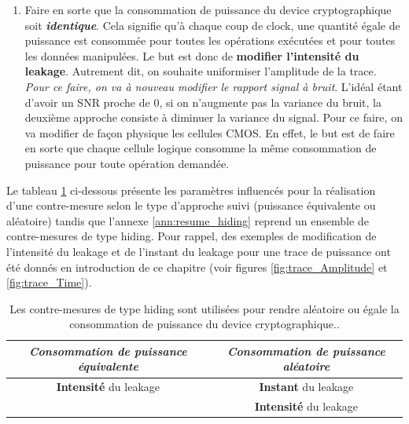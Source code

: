 \documentclass[oneside]{book}
\begin{document}
\begin{enumerate}
\item Faire en sorte que la consommation de puissance du device cryptographique soit \textbf{\textit{identique}}. Cela signifie qu'à chaque coup de clock, une quantité égale de puissance est consommée pour toutes les opérations exécutées et pour toutes les données manipulées. Le but est donc de \textbf{modifier l'intensité du leakage}. Autrement dit, on souhaite uniformiser l'amplitude de la trace. 
\textit{Pour ce faire, on va à nouveau modifier le rapport signal à bruit}. L'idéal étant d'avoir un SNR proche de 0, si on n'augmente pas la variance du bruit, la deuxième approche consiste à diminuer la variance du signal. Pour ce faire, on va modifier de façon physique les cellules CMOS. En effet, le but est de faire en sorte que chaque cellule logique consomme la même consommation de puissance pour toute opération demandée. \\
\end{enumerate}

\hspace{-0.5cm}Le tableau \ref{tab:hiding} ci-dessous présente les paramètres influencés pour la réalisation d'une contre-mesure selon le type d'approche suivi (puissance équivalente ou aléatoire) tandis que l'annexe \ref{ann:resume_hiding} reprend un ensemble de contre-mesures de type hiding. Pour rappel, des exemples de modification de l'intensité du leakage et de l'instant du leakage pour une trace de puissance ont été donnés en introduction de ce chapitre (voir figures \ref{fig:trace_Amplitude} et \ref{fig:trace_Time}).

\begin{table}[htbp]
	\centering
	\begin{tabular}{|c|c|}
    		\hline
   		  \textit{Consommation de puissance \textbf{équivalente}} & \textit{Consommation de puissance \textbf{aléatoire}} \\ \hline 
   		  \textbf{Intensité} du leakage &  \textbf{Instant} du leakage \\ 
   		   &  \textbf{Intensité} du leakage \\ \hline
	\end{tabular}
    	\caption{Les contre-mesures de type hiding sont utilisées pour rendre aléatoire ou égale la consommation de puissance du device cryptographique..}
    	\label{tab:hiding} 
\end{table}
\end{document}

